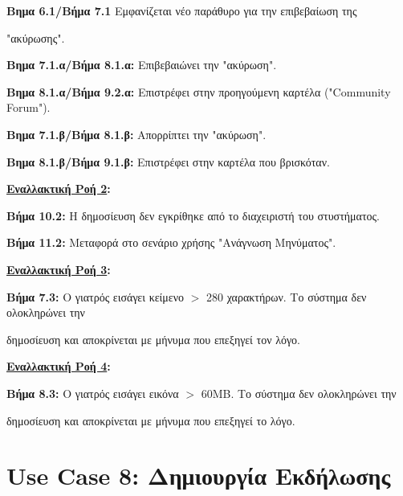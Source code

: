 \documentclass{article}
\begin{document}
\vspace{0.2cm}

\par \textbf{Βημα 6.1/Βήμα 7.1} Εμφανίζεται νέο παράθυρο για την επιβεβαίωση της \par "ακύρωσης". \vspace{0.1cm}
\par \textbf{Βημα 7.1.α/Βήμα 8.1.α:} Επιβεβαιώνει την "ακύρωση". \vspace{0.1cm}
\par \textbf{Βημα 8.1.α/Βήμα 9.2.α:} Επιστρέφει στην προηγούμενη καρτέλα ("Community Forum"). \vspace{0.2cm}

\par \textbf{Βημα 7.1.β/Βήμα 8.1.β:}  Απορρίπτει την "ακύρωση". \vspace{0.1cm}
\par \textbf{Βημα 8.1.β/Βήμα 9.1.β:} Επιστρέφει στην καρτέλα που βρισκόταν. \vspace{0.2cm}

\textbf{\underline{Εναλλακτική Ροή 2}:} \vspace{0.2cm}
\par \textbf{Βήμα 10.2:} Η δημοσίευση δεν εγκρίθηκε από το διαχειριστή του στυστήματος. \vspace{0.1cm}
\par \textbf{Βήμα 11.2:} Μεταφορά στο σενάριο χρήσης "Ανάγνωση Μηνύματος". \vspace{0.2cm}

\textbf{\underline{Εναλλακτική Ροή 3}:} \vspace{0.2cm}
\par \textbf{Βήμα 7.3:} Ο γιατρός εισάγει κείμενο $>$ 280 χαρακτήρων. Το σύστημα δεν ολοκληρώνει την \par δημοσίευση και αποκρίνεται με μήνυμα που επεξηγεί τον λόγο. \vspace{0.2cm}

\textbf{\underline{Εναλλακτική Ροή 4}:} \vspace{0.2cm}
\par \textbf{Βήμα 8.3:} Ο γιατρός εισάγει εικόνα $>$ 60MB. Το σύστημα δεν ολοκληρώνει την \par δημοσίευση και αποκρίνεται με μήνυμα που επεξηγεί το λόγο.

\newpage

\section{Use Case 8: Δημιουργία Εκδήλωσης}
\end{document}
